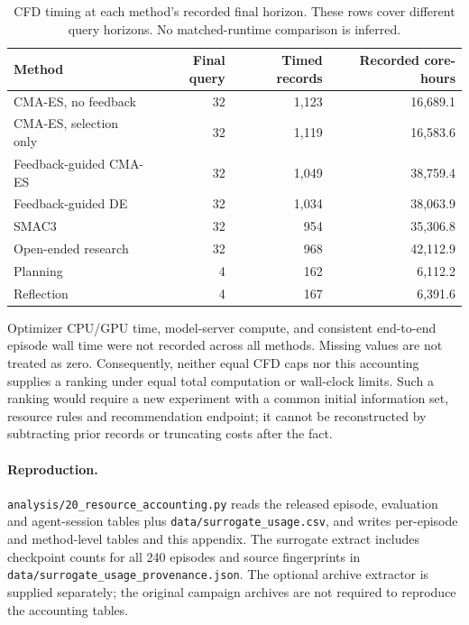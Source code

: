 \begin{table}[htbp]\centering\scriptsize
\caption{CFD timing at each method's recorded final horizon. These rows cover different query horizons. No matched-runtime comparison is inferred.}
\label{tab:resource-cfd-time}
\setlength{\tabcolsep}{4pt}
\begin{tabular*}{\textwidth}{@{\extracolsep{\fill}}lrrr}\toprule
Method & Final query & Timed records & Recorded core-hours \\ \midrule
CMA-ES, no feedback & 32 & 1{,}123 & 16{,}689.1 \\
CMA-ES, selection only & 32 & 1{,}119 & 16{,}583.6 \\
Feedback-guided CMA-ES & 32 & 1{,}049 & 38{,}759.4 \\
Feedback-guided DE & 32 & 1{,}034 & 38{,}063.9 \\
SMAC3 & 32 & 954 & 35{,}306.8 \\
Open-ended research & 32 & 968 & 42{,}112.9 \\
Planning & 4 & 162 & 6{,}112.2 \\
Reflection & 4 & 167 & 6{,}391.6 \\
\bottomrule\end{tabular*}\end{table}

Optimizer CPU/GPU time, model-server compute, and consistent end-to-end episode wall time were not recorded across all methods. Missing values are not treated as zero. Consequently, neither equal CFD caps nor this accounting supplies a ranking under equal total computation or wall-clock limits. Such a ranking would require a new experiment with a common initial information set, resource rules and recommendation endpoint; it cannot be reconstructed by subtracting prior records or truncating costs after the fact.
\paragraph{Reproduction.} \texttt{analysis/20\_resource\_accounting.py} reads the released episode, evaluation and agent-session tables plus \texttt{data/surrogate\_usage.csv}, and writes per-episode and method-level tables and this appendix. The surrogate extract includes checkpoint counts for all 240 episodes and source fingerprints in \texttt{data/surrogate\_usage\_provenance.json}. The optional archive extractor is supplied separately; the original campaign archives are not required to reproduce the accounting tables.
